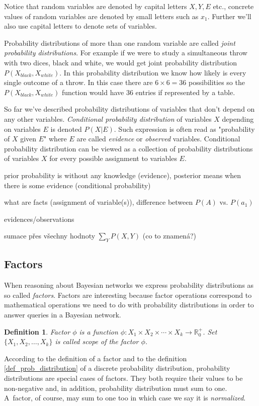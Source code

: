 \documentclass[english,cover]{fitthesis} %
\newtheorem{math_def}{Definition}[chapter] %
\newcommand{\term}[1]{\emph{#1}}           %
\newcommand{\todo}[1]{{\color{red} #1}}
\begin{document}
Notice that random variables are denoted by capital letters $X, Y, E$ etc., concrete values of random variables are denoted by small letters such as $x_1$. Further we'll also use capital letters to denote sets of variables.

Probability distributions of more than one random variable are called \term{joint probability distributions}. For example if we were to study a simultaneous throw with two dices, black and white, we would get joint probability distribution $P(X_{black},X_{white})$. In this probability distribution we know how likely is every single outcome of a throw. In this case there are $6 \times 6 = 36$ possibilities so the $P(X_{black},X_{white})$ function would have 36 entries if represented by a table.

So far we've described probability distributions of variables that don't depend on any other variables. \term{Conditional probability distribution} of variables $X$ depending on variables $E$ is denoted $P(X|E)$. Such expression is often read as "probability of $X$ given $E$" where $E$ are called \term{evidence} or \term{observed} variables. Conditional probability distribution can be viewed as a collection of probability distributions of variables $X$ for every possible assignment to variables $E$.

\todo{prior probability is without any knowledge (evidence), posterior means when there is some evidence (conditional probability)}

\todo{
    what are facts (assignment of variable(s)), difference between $P(A)$ vs. $P(a_1)$
    
    evidences/observations
    
    sumace přes všechny hodnoty $\sum_Y P(X, Y)$ (co to znamená?)
}

\subsection{Factors}
When reasoning about Bayesian networks we express probability distributions as so called \term{factors}. Factors are interesting because factor operations correspond to mathematical operations we need to do with probability distributions in order to answer queries in a Bayesian network. 
\begin{math_def}\label{def_factor}
    Factor $\phi$ is a function $\phi: X_1 \times X_2 \times \dotsm \times X_k \rightarrow \mathbb{R}_0^+$. Set $\lbrace X_1, X_2, \dots, X_k \rbrace$ is called scope of the factor $\phi$.
\end{math_def}
According to the definition of a factor and to the definition \ref{def_prob_distribution} of a discrete probability distribution, probability distributions are special cases of factors. They both require their values to be non-negative and, in addition, probability distribution must sum to one. A~factor, of course, may sum to one too in which case we say it is \term{normalized}.
\end{document}
